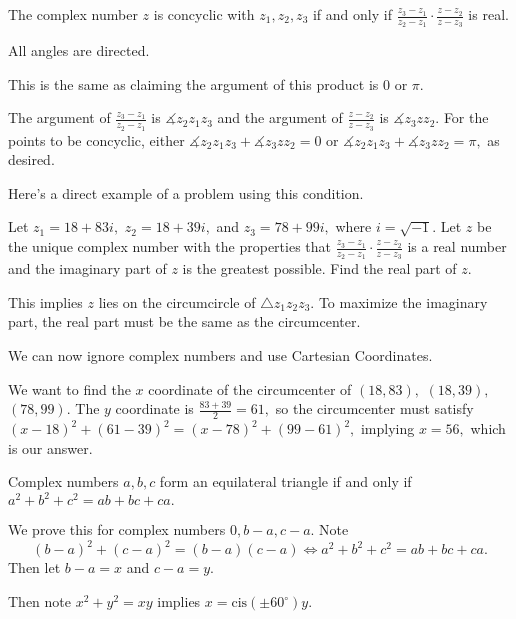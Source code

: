 \documentclass[mast]{lucky}
\begin{document}
\begin{theo}
The complex number $z$ is concyclic with $z_1,z_2,z_3$ if and only if $\frac{z_3-z_1}{z_2-z_1}\cdot\frac{z-z_2}{z-z_3}$ is real.
\end{theo}

\begin{pro}
All angles are directed.

This is the same as claiming the argument of this product is $0$ or $\pi.$ 

The argument of $\frac{z_3-z_1}{z_2-z_1}$ is $\measuredangle z_2z_1z_3$ and the argument of $\frac{z-z_2}{z-z_3}$ is $\measuredangle z_3zz_2.$ For the points to be concyclic, either $\measuredangle z_2z_1z_3+\measuredangle z_3zz_2=0$ or $\measuredangle z_2z_1z_3+\measuredangle z_3zz_2=\pi,$ as desired.
\end{pro}

Here's a direct example of a problem using this condition.

\begin{exam}[AIME I 2017/10]
Let $z_1=18+83i,$ $z_2=18+39i,$ and $z_3=78+99i,$ where $i=\sqrt{-1}.$ Let $z$ be the unique complex number with the properties that $\frac{z_3-z_1}{z_2-z_1}\cdot\frac{z-z_2}{z-z_3}$ is a real number and the imaginary part of $z$ is the greatest possible. Find the real part of $z$.
\end{exam}

\begin{sol}
This implies $z$ lies on the circumcircle of $\triangle z_1z_2z_3.$ To maximize the imaginary part, the real part must be the same as the circumcenter.

We can now ignore complex numbers and use Cartesian Coordinates.

We want to find the $x$ coordinate of the circumcenter of $(18, 83),$ $(18, 39),$ $(78, 99).$ The $y$ coordinate is $\frac{83+39}{2}=61,$ so the circumcenter must satisfy $(x-18)^2+(61-39)^2=(x-78)^2+(99-61)^2,$ implying $x=56,$ which is our answer.
\end{sol}

\begin{theo}
Complex numbers $a,b,c$ form an equilateral triangle if and only if $a^2+b^2+c^2=ab+bc+ca.$
\end{theo}

\begin{pro}
We prove this for complex numbers $0,b-a,c-a.$ Note 
\[(b-a)^2+(c-a)^2=(b-a)(c-a)\Leftrightarrow a^2+b^2+c^2=ab+bc+ca.\]
Then let $b-a=x$ and $c-a=y.$

Then note $x^2+y^2=xy$ implies $x=\text{cis}(\pm 60^{\circ})y.$
\end{pro}
\end{document}
